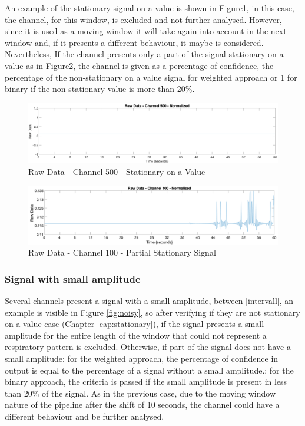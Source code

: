 An example of the stationary signal on a value is shown in Figure\ref{fig:stationaryTotal}, in this case, the channel, for this window, is excluded and not further analysed.
However, since it is used as a moving window it will take again into account in the next window and, if it presents a different behaviour, it maybe is considered. 
Nevertheless, If the channel presents only a part of the signal stationary on a value as in Figure\ref{fig:spikePartial}, the channel is given as a percentage of confidence, the percentage of the non-stationary on a value signal for weighted approach or 1 for binary if the non-stationary value is more than 20\%.
\vspace*{0.5cm}
\begin{figure}[H]
    \centering
    \includegraphics[width=\textwidth]{img/stationary.pdf}
    \caption{Raw Data - Channel 500 -  Stationary on a Value}
    \label{fig:stationaryTotal}
\end{figure}
\vspace*{0.5cm}
\begin{figure}[H]
    \centering
    \includegraphics[width=\textwidth]{img/spakePartial.pdf}
    \caption{Raw Data - Channel 100 - Partial Stationary Signal}
    \label{fig:spikePartial}
\end{figure}

\subsubsection*{Signal with small amplitude}\label{cap:noisy}

Several channels present a signal with a small amplitude, between [intervall], an example is visible in Figure \ref{fig:noisy}, so after verifying if they are not stationary on a value case (Chapter \ref{cap:stationary}), if the signal presents a small amplitude for the entire length of the window that could not represent a respiratory pattern is excluded. 
Otherwise, if part of the signal does not have a small amplitude: for the weighted approach, the percentage of confidence in output is equal to the percentage of a signal without a small amplitude.; for the binary approach, the criteria is passed if the small amplitude is present in less than 20\% of the signal.
As in the previous case, due to the moving window nature of the pipeline after the shift of 10 seconds, the channel could have a different behaviour and be further analysed.\\


